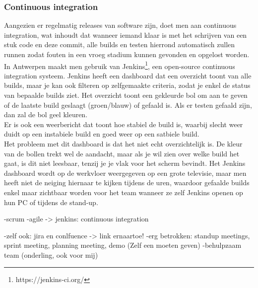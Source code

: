 \documentclass[10pt,a4paper]{article}
\begin{document}
\subsubsection{Continuous integration}
Aangezien er regelmatig releases van software zijn, doet men aan continuous integration, wat inhoudt dat wanneer iemand klaar is met het schrijven van een stuk code en deze commit, alle builds en testen hierrond automatisch zullen runnen zodat fouten in een vroeg stadium kunnen gevonden en opgelost worden.\\
In Antwerpen maakt men gebruik van Jenkins\footnote{https://jenkins-ci.org/}, een open-source continuous integration systeem. Jenkins heeft een dashboard dat een overzicht toont van alle builds, maar je kan ook filteren op zelfgemaakte criteria, zodat je enkel de status van bepaalde builds ziet. Het overzicht toont een gekleurde bol om aan te geven of de laatste build geslaagt (groen/blauw) of gefaald is. Als er testen gefaald zijn, dan zal de bol geel kleuren.\\
Er is ook een weerbericht dat toont hoe stabiel de build is, waarbij slecht weer duidt op een instabiele build en goed weer op een satbiele build.  \\
Het probleem met dit dashboard is dat het niet echt overzichtelijk is. De kleur van de bollen trekt wel de aandacht, maar als je wil zien over welke build het gaat, is dit niet leesbaar, tenzij je je vlak voor het scherm bevindt. Het Jenkins dashboard wordt op de werkvloer weergegeven op een grote televisie, maar men heeft niet de neiging hiernaar te kijken tijdens de uren, waardoor gefaalde builds enkel maar zichtbaar worden voor het team wanneer ze zelf Jenkins openen op hun PC of tijdens de stand-up.  


-scrum
-agile
-> jenkins: continuous integration

-zelf ook: jira en conlfuence -> link ernaartoe!
-erg betrokken: standup meetings, sprint meeting, planning meeting, demo (Zelf een moeten geven)
-behulpzaam team (onderling, ook voor mij)
\end{document}

